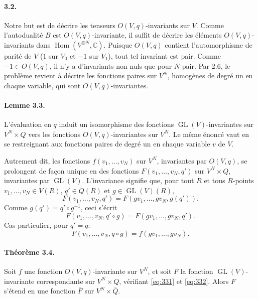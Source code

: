 \documentclass[11pt]{article}
\newcommand{\C}{\mathbb C}
\newcommand{\Hom}{\operatorname{Hom}}
\newcommand{\GL}{\operatorname{GL}}
\newcommand{\barQ}{\overline Q}
\begin{document}
\paragraph{3.2.}
Notre but est de décrire les tenseurs $O(V,q)$-invariants sur $V$. Comme l'autodualité $B$ est $O(V,q)$-invariante, il suffit de décrire les éléments $O(V,q)$-invariants dans $\Hom(V^{\otimes N},\C)$. Puisque $O(V,q)$ contient l'automorphisme de parité de $V$ ($1$ sur $V_0$ et $-1$ sur $V_1$), tout tel invariant est pair. Comme $-1\in O(V,q)$, il n'y a d'invariants non nuls que pour $N$ pair. Par 2.6, le problème revient à décrire les fonctions paires sur $V^N$, homogènes de degré un en chaque variable, qui sont $O(V,q)$-invariantes.

\paragraph{Lemme 3.3.}
L'évaluation en $q$ induit un isomorphisme des fonctions $\GL(V)$-invariantes sur $V^N\times Q$ vers les fonctions $O(V,q)$-invariantes sur $V^N$. Le même énoncé vaut en se restreignant aux fonctions paires de degré un en chaque variable $v$ de $V$.

Autrement dit, les fonctions $f(v_1,\ldots,v_N)$ sur $V^N$, invariantes par $O(V,q)$, se prolongent de façon unique en des fonctions $F(v_1,\ldots,v_N,q')$ sur $V^N\times Q$, invariantes par $\GL(V)$. L'invariance signifie que, pour tout $R$ et tous $R$-points $v_1,\ldots,v_N\in V(R)$, $q'\in Q(R)$ et $g\in\GL(V)(R)$,
\[
F(v_1,\ldots,v_N,q')=F(gv_1,\ldots,gv_N,g(q')).
\]
Comme $g(q')=q'\circ g^{-1}$, ceci s'écrit
\begin{equation}
\label{eq:331}
F(v_1,\ldots,v_N,q'\circ g)=F(gv_1,\ldots,gv_N,q').
\end{equation}
Cas particulier, pour $q'=q$:
\begin{equation}
\label{eq:332}
F(v_1,\ldots,v_N,q\circ g)=f(gv_1,\ldots,gv_N).
\end{equation}

\paragraph{Théorème 3.4.}
Soit $f$ une fonction $O(V,q)$-invariante sur $V^N$, et soit $F$ la fonction $\GL(V)$-invariante correspondante sur $V^N\times Q$, vérifiant \eqref{eq:331} et \eqref{eq:332}. Alors $F$ s'étend en une fonction $\overline F$ sur $V^N\times\barQ$.
\end{document}

